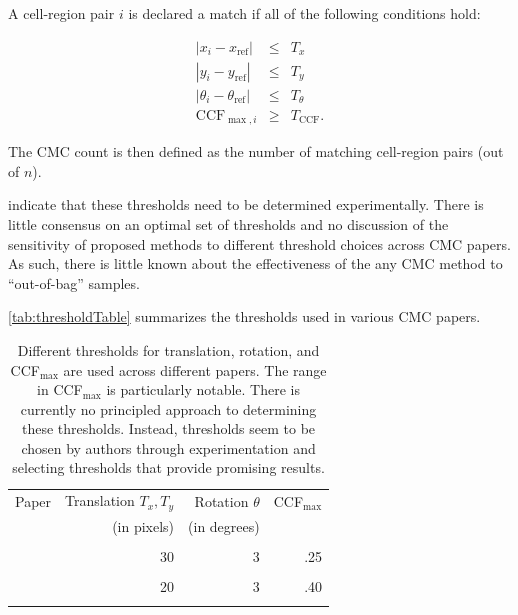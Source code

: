 A cell-region pair \(i\) is declared a match if all of the following
conditions hold:

\begin{eqnarray}\label{eq:original}
|x_i - x_{\text{ref}}| &\leq& T_{x} \\ \nonumber
|y_i - y_{\text{ref}}| &\leq& T_{y} \\ \nonumber
|\theta_i - \theta_{\text{ref}}| &\leq& T_{\theta} \\ \nonumber
\text{CCF}_{\max,i} &\geq& T_{\text{CCF}}.
\end{eqnarray}

The CMC count is then defined as the number of matching cell-region
pairs (out of \(n\)).

\citet{song_3d_2014} indicate that these thresholds need to be
determined experimentally. There is little consensus on an optimal set
of thresholds and no discussion of the sensitivity of proposed methods
to different threshold choices across CMC papers. As such, there is
little known about the effectiveness of the any CMC method to
``out-of-bag'' samples.

\autoref{tab:thresholdTable} summarizes the thresholds used in various
CMC papers.

\begin{table}[ht]
    \centering
    \begin{tabular}{|lrrr|}
      \hline
        Paper & Translation $T_x, T_y$ & Rotation $\theta$ & CCF$_{\max}$ \\
              & (in pixels) & (in degrees) \\
        \hline
        \cellcolor{lightgray}{\citet{song_3d_2014}} & \cellcolor{lightgray}{20} &
        \cellcolor{lightgray}{6} & \cellcolor{lightgray}{.60} \\

        \citet{tong_fired_2014} & 30 & 3 & .25 \\

        \cellcolor{lightgray}{\citet{tong_improved_2015}} & \cellcolor{lightgray}{15} &
        \cellcolor{lightgray}{3} & \cellcolor{lightgray}{.55} \\

        \citet{chen_convergence_2017} & 20 & 3 & .40 \\

        \cellcolor{lightgray}{\citet{song_estimating_2018}} & \cellcolor{lightgray}{20} &
        \cellcolor{lightgray}{6} & \cellcolor{lightgray}{.50}\\
        \hline
    \end{tabular}
    \caption{Different thresholds for translation, rotation, and CCF$_{\max}$ are used across different papers. The range in CCF$_{\max}$ is particularly notable. There is currently no principled approach to determining these thresholds. Instead, thresholds seem to be chosen by authors through experimentation and selecting thresholds that provide promising results.}
    \label{tab:thresholdTable}
\end{table}

